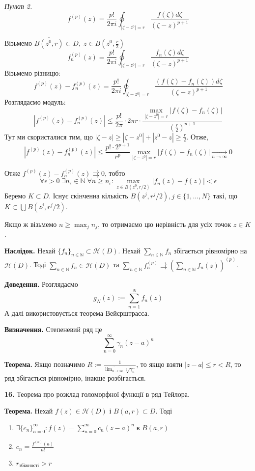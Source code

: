 \documentclass[14pt]{extarticle}
\begin{document}
\textit{Пункт 2.} 
\[
f^{(p)}(z) = \frac{p!}{2\pi i}\oint_{|\zeta-z^0|=r} \frac{f(\zeta)d\zeta}{(\zeta-z)^{p+1}}
\]

Візьмемо $\overline{B(z^0,r)} \subset D, \; z \in B(z^0,\frac{r}{2})$
\[
f_n^{(p)}(z) = \frac{p!}{2\pi i}\oint_{|\zeta-z^0|=r} \frac{f_n(\zeta)d\zeta}{(\zeta-z)^{p+1}}
\]
Візьмемо різницю:
\[
f^{(p)}(z) - f_n^{(p)}(z) = \frac{p!}{2\pi i}\oint_{|\zeta-z^0|=r} \frac{(f(\zeta)-f_n(\zeta))d\zeta}{(\zeta-z)^{p+1}}
\]
Розглядаємо модуль:
\[
|f^{(p)}(z)-f_n^{(p)}(z)| \leq \frac{p!}{2\pi} \cdot 2\pi r \cdot \frac{\max_{|\zeta-z^0|=r}|f(\zeta)-f_n(\zeta)|}{\left(\frac{r}{2}\right)^{p+1}}
\]
Тут ми скористалися тим, що $|\zeta-z| \geq |\zeta-z^0|+|z^0-z| \geq \frac{r}{2}$. Отже,
\[
|f^{(p)}(z)-f_n^{(p)}(z)| \leq \frac{p!\cdot 2^{p+1}}{r^p}\max_{|\zeta-z^0|=r}|f(\zeta)-f_n(\zeta)| \xrightarrow[n \to \infty]{} 0
\]

Отже $f^{(p)}(z) - f_n^{(p)}(z) \rightrightarrows 0$, тобто
\[
\forall \epsilon > 0 \; \exists n_{\epsilon} \in \mathbb{N} \; \forall n \geq n_{\epsilon}: \max_{z \in B(z^0,r/2)}|f_n(z)-f(z)| < \epsilon
\]
Беремо $K \subset D$. Існує скінченна кількість $B(z^j,r^j/2),j\in\{1,\dots,N\}$ такі, що $K \subset \bigcup B(z^j,r^j/2)$.

Якщо ж візьмемо $n \geq \max_j n_j$, то отримаємо цю нерівність для усіх точок $z \in K$.  

\textbf{Наслідок.} Нехай $\{f_n\}_{n \in \mathbb{N}} \subset \mathcal{H}(D)$. Нехай $\sum_{n \in \mathbb{N}}f_n$ збігається рівномірно на $\mathcal{H}(D)$. Тоді $\sum_{n \in \mathbb{N}}f_n \in \mathcal{H}(D)$ та $\sum_{n \in \mathbb{N}}f_n^{(p)} \rightrightarrows \left(\sum_{n \in \mathbb{N}}f_n(z)\right)^{(p)}$.

\textbf{Доведення.} Розглядаємо
\[
g_N(z) := \sum_{n=1}^N f_n(z)
\]
А далі використовується теорема Вейєрштрасса. 

\textbf{Визначення.} Степеневий ряд це
\[
\sum_{n=0}^{\infty} \gamma_n(z-a)^n
\]

\textbf{Теорема.} Якщо позначимо $R:=\frac{1}{\overline{\lim_{n \to \infty}}\sqrt[n]{\gamma_n}}$, то якщо взяти $|z-a|\leq r < R$, то ряд збігається рівномірно, інакше розбігається.

\textbf{16.} Теорема про розклад голоморфної функції в ряд Тейлора.

\textbf{Теорема.} Нехай $f(z) \in \mathcal{H}(D)$ і $B(a,r) \subset D$. Тоді
\begin{enumerate}
\item $
\exists \{c_n\}_{n=0}^{\infty}: f(z) = \sum_{n=0}^{\infty} c_n(z-a)^n \; \text{в $B(a,r)$}
$
\item $c_n = \frac{f^{(n)}(a)}{n!}$
\item $r_{\text{збіжності}} > r$
\end{enumerate}
\end{document}

